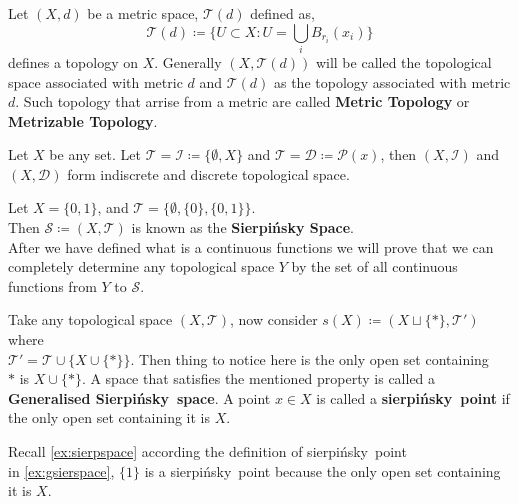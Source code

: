 \documentclass{scrartcl} %
\newcommand{\Tau}{\mathcal{T}}
\newcommand{\sP}{\mathcal{P}}
\newcommand{\sI}{\mathcal{I}}
\newcommand{\sD}{\mathcal{D}}
\newcommand{\sS}{\mathcal{S}}
\newcommand{\sSp}{Sierpi\'nsky}
\newcommand{\ssp}{sierpi\'nsky}
\begin{document}
\begin{theorem}
Let $\left(X, d\right)$ be a metric space, $\Tau(d)$
defined as, 
\[
	\Tau(d) \coloneq \{ U \subset X : U = 
	\bigcup\limits_i B_{r_i} (x_i) \}
\]
defines a topology on $X$. Generally $\left(X, \Tau(d)
	\right)$ will be called the topological space
associated with metric $d$ and $\Tau(d)$ as the topology
associated with metric $d$. Such topology that arrise
from a metric are called \textbf{Metric Topology} or 
\textbf{Metrizable Topology}.
\end{theorem}
\begin{example}
	\label{ex:di}
Let $X$ be any set. Let $\Tau = \sI \coloneq \{\emptyset
, X\}$ and $\Tau = \sD \coloneq \sP(x)$, then 
$\left(X, \sI\right)$ and $\left(X, \sD\right)$ form
indiscrete and discrete topological space.
\end{example}
\begin{example}
\label{ex:sierpspace}
	Let $X = \{0, 1\}$, and
	$\Tau = \{\emptyset, \{0\}, \{0, 1\} \}$.\\
Then $\sS \coloneq \left(X, \Tau \right)$
	is known as the \textbf{Sierpi\'nsky Space}. \\
	After we have defined what is a continuous 
	functions we will prove that we can completely
	determine any topological space $Y$ by the
	set of all continuous functions from
	$Y$ to $\sS$.
\end{example}
\begin{example}
	\label{ex:gsierspace}
	Take any topological space 
	$\left(X, \Tau\right)$, now consider 
	$s(X) \coloneq
	\left( X \sqcup \{*\}, \Tau'\right)$ where \\
	$\Tau' = \Tau \cup \{X \cup \{*\} \}$. Then
	thing to notice here is the only open set
	containing\\ $*$ is $X \cup \{*\}$. A space
	that satisfies the mentioned property is called
	a\\ \textbf{Generalised \sSp \ space}. A point 
	$x \in X$ is called a \textbf{\ssp \ point}
	if the only open set containing it is $X$.
\end{example}
\begin{remark}
	Recall \autoref{ex:sierpspace} according 
	the definition
	of \ssp \ point\\ in \autoref{ex:gsierspace}, $\{1\}$
	is a \ssp \ point because the only open set
	containing it is $X$.
\end{remark}
\newpage
\end{document}
